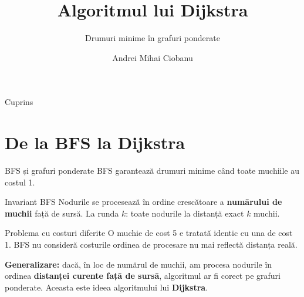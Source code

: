 \documentclass[10pt]{beamer}
\title{Algoritmul lui Dijkstra}
\subtitle{Drumuri minime în grafuri ponderate}
\author{Andrei Mihai Ciobanu}
\institute{Algolymp Summer School}
\date{}
\begin{document}
\begin{frame}
  \titlepage
\end{frame}

\begin{frame}{Cuprins}
  \tableofcontents[hideallsubsections]
\end{frame}

\section{De la BFS la Dijkstra}

\begin{frame}{BFS și grafuri ponderate}
  BFS garantează drumuri minime când toate muchiile au costul 1.

  \begin{block}{Invariant BFS}
    Nodurile se procesează în ordine crescătoare a \textbf{numărului de muchii}
    față de sursă. La runda $k$: toate nodurile la distanță exact $k$ muchii.
  \end{block}

  \begin{alertblock}{Problema cu costuri diferite}
    O muchie de cost 5 e tratată identic cu una de cost 1.
    BFS nu consideră costurile \textemdash{} ordinea de procesare nu mai reflectă distanța reală.
  \end{alertblock}

  \smallskip
  \textbf{Generalizare:} dacă, în loc de numărul de muchii, am procesa nodurile
  în ordinea \textbf{distanței curente față de sursă}, algoritmul ar fi corect
  pe grafuri ponderate. Aceasta este ideea algoritmului lui \textbf{Dijkstra}.
\end{frame}
\end{document}
